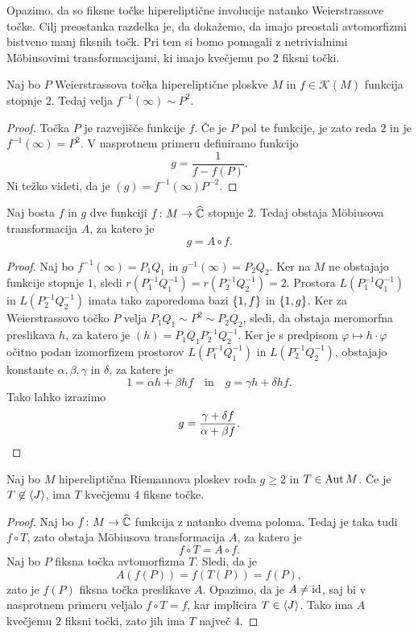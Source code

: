 Opazimo, da so fiksne točke hipereliptične involucije natanko
Weierstrassove točke. Cilj preostanka razdelka je, da dokažemo, da
imajo preostali avtomorfizmi bistveno manj fiksnih točk. Pri tem si
bomo pomagali z netrivialnimi Möbiusovimi transformacijami, ki
imajo kvečjemu po $2$ fiksni točki.

\begin{lema}
Naj bo $P$ Weierstrassova točka hipereliptične ploskve $M$ in
$f \in \mathscr{K}(M)$ funkcija stopnje $2$. Tedaj velja
$f^{-1}(\infty) \sim P^2$.
\end{lema}

\begin{proof}
Točka $P$ je razvejišče funkcije $f$. Če je $P$ pol te funkcije, je
zato reda $2$ in je $f^{-1}(\infty) = P^2$. V nasprotnem primeru
definiramo funkcijo
\[
g = \frac{1}{f - f(P)}.
\]
Ni težko videti, da je $(g) = f^{-1}(\infty) P^{-2}$.
\end{proof}

\begin{trditev}
Naj bosta $f$ in $g$ dve funkciji $f \colon M \to \widehat{\mathbb{C}}$ stopnje
$2$. Tedaj obstaja Möbiusova transformacija $A$, za katero je
\[
g = A \circ f.
\]
\end{trditev}

\begin{proof}
Naj bo $f^{-1}(\infty) = P_1 Q_1$ in $g^{-1}(\infty) = P_2 Q_2$.
Ker na $M$ ne obstajajo funkcije stopnje $1$, sledi
$r(P_1^{-1} Q_1^{-1}) = r(P_2^{-1} Q_2^{-1}) = 2$. Prostora
$L(P_1^{-1} Q_1^{-1})$ in $L(P_2^{-1} Q_2^{-1})$ imata tako
zaporedoma bazi $\left\{1, f\right\}$ in $\left\{1, g\right\}$. Ker za Weierstrassovo
točko $P$ velja $P_1 Q_1 \sim P^2 \sim P_2 Q_2$, sledi, da obstaja
meromorfna preslikava $h$, za katero je
$(h) = P_1 Q_1 P_2^{-1} Q_2^{-1}$. Ker je s predpisom
$\varphi \mapsto h \cdot \varphi$ očitno podan izomorfizem
prostorov $L(P_1^{-1} Q_1^{-1})$ in $L(P_2^{-1} Q_2^{-1})$,
obstajajo konstante $\alpha, \beta, \gamma$ in $\delta$, za katere
je
\[
1 = \alpha h + \beta hf
\quad \text{in} \quad
g = \gamma h + \delta hf.
\]
Tako lahko izrazimo
\[
g = \frac{\gamma + \delta f}{\alpha + \beta f}. \qedhere
\]
\end{proof}

\begin{trditev}
Naj bo $M$ hipereliptična Riemannova ploskev roda $g \geq 2$ in
$T \in \operatorname{Aut} M$. Če je $T \not \in \left\langle J\right\rangle$, ima $T$ kvečjemu $4$
fiksne točke.
\end{trditev}

\begin{proof}
Naj bo $f \colon M \to \widehat{\mathbb{C}}$ funkcija z natanko dvema poloma. Tedaj
je taka tudi $f \circ T$, zato obstaja Möbiusova transformacija
$A$, za katero je
\[
f \circ T = A \circ f.
\]
Naj bo $P$ fiksna točka avtomorfizma $T$. Sledi, da je
\[
A(f(P)) = f(T(P)) = f(P),
\]
zato je $f(P)$ fiksna točka preslikave $A$. Opazimo, da je
$A \ne \operatorname{id}$, saj bi v nasprotnem primeru veljalo $f \circ T = f$,
kar implicira $T \in \left\langle J\right\rangle$. Tako ima $A$ kvečjemu $2$ fiksni
točki, zato jih ima $T$ največ $4$.
\end{proof}
